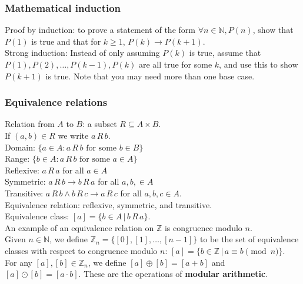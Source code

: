 \documentclass[letterpaper,8pt,landscape]{article}
\newcommand{\R}[2]{#1\,R\,#2}
\begin{document}
\begin{multicols}{3}
\subsubsection*{Mathematical induction}
Proof by induction: to prove a statement of the form $\forall n\in \mathbb{N}, P(n)$, show that $P(1)$ is true and that for $k\geq 1$, $P(k)\to P(k+1)$.\\
Strong induction: Instead of only assuming $P(k)$ is true, assume that $P(1), P(2), \ldots, P(k-1), P(k)$ are all true for some $k$, and use this to show $P(k+1)$ is true. Note that you may need more than one base case.

\subsubsection*{Equivalence relations}
Relation from $A$ to $B$: a subset $R\subseteq A\times B$.\\
If $(a,b)\in R$ we write $\R{a}{b}$.\\
Domain: $\{a\in A : \R{a}{b} \text{ for some } b \in B\}$\\
Range: $\{b\in A : \R{a}{b} \text{ for some } a\in A\}$\\
Reflexive: $\R{a}{a}$ for all $a\in A$\\
Symmetric: $\R{a}{b}\to \R{b}{a}$ for all $a,b,\in A$\\
Transitive: $\R{a}{b} \wedge \R{b}{c} \to \R{a}{c}$  for all $a,b,c\in A$.\\
Equivalence relation: reflexive, symmetric, and transitive.\\
Equivalence class: $[a] = \{b\in A \,|\, \R{b}{a}\}$.\\
An example of an equivalence relation on $\mathbb{Z}$ is congruence modulo $n$.\\
Given $n\in\mathbb{N}$, we define $\mathbb{Z}_n = \{[0],[1],\ldots,[n-1]\}$ to be the set of equivalence classes with respect to congruence modulo $n$: $[a] = \{b\in \mathbb{Z}\,|\, a\equiv b \pmod{n}\}$.\\
For any $[a],[b]\in\mathbb{Z}_n$, we define $[a]\oplus[b] = [a+b]$ and $[a]\odot[b] = [a\cdot b]$. These are the operations of {\bf modular arithmetic}.

\end{multicols}
\end{document}
